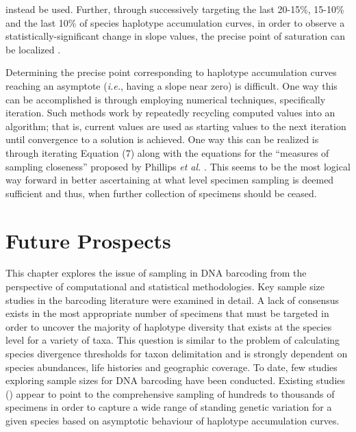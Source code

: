 instead be used. Further, through successively targeting the last 20-15\%, 15-10\% and the last 10\% of species haplotype accumulation curves, in order to observe a statistically-significant change in slope values, the precise point of saturation can be localized \cite{phillips2015exploration}.



Determining the precise point corresponding to haplotype accumulation curves \\ reaching an asymptote (\textit{i.e.}, having a slope near zero) is difficult. One way this can be accomplished is through employing numerical techniques, specifically iteration. Such methods work by repeatedly recycling computed values into an algorithm; that is, current values are used as starting values to the next iteration until convergence to a solution is achieved. One way this can be realized is through iterating Equation (7) along with the equations for the ``measures of sampling closeness'' proposed by Phillips \textit{et al.} \cite{phillips2015exploration}. This seems to be the most logical way forward in better ascertaining at what level specimen sampling is deemed sufficient and thus, when further collection of specimens should be ceased.



\section{Future Prospects}

This chapter explores the issue of sampling in DNA barcoding from the perspective of computational and statistical methodologies. Key sample size studies in the barcoding literature were examined in detail. A lack of consensus exists in the most appropriate number of specimens that must be targeted in order to uncover the majority of haplotype diversity that exists at the species level for a variety of taxa. This question is similar to the problem of calculating species divergence thresholds for taxon delimitation and is strongly dependent on species abundances, life histories and geographic coverage. To date, few studies exploring sample sizes for DNA barcoding have been conducted. Existing studies (\cite{phillips2015exploration, zhang2010estimating}) appear to point to the comprehensive sampling of hundreds to thousands of specimens in order to capture a wide range of standing genetic variation for a given species based on asymptotic behaviour of haplotype accumulation curves.



